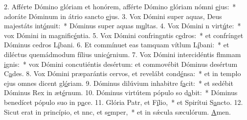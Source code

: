 2. Afférte Dómino glóriam et honórem, afférte Dómino glóriam nómni \uline{e}jus:~* adoráte Dóminum in átrio sancto \uline{e}jus.
3. Vox Dómini super aquas, Deus majestáts int\uline{ó}nuit:~* Dóminus super aquas m\uline{u}ltas.
4. Vox Dómini n virt\uline{ú}te:~* vox Dómini in magnific\uline{é}ntia.
5. Vox Dómini confringntis c\uline{e}dros:~* et confrínget Dóminus cedros L\uline{í}bani.
6. Et commínuet eas tamquam vítlum L\uline{í}bani:~* et diléctus quemádmodum fílius unic\uline{ó}rnium.
7. Vox Dómini intercidéntis flmmam \uline{i}gnis:~* vox Dómini concutiéntis desértum: et commovébit Dóminus desértum C\uline{a}des.
8. Vox Dómini præparántis cervos, et revelábt cond\uline{é}nsa:~* et in templo ejus omnes dicent gl\uline{ó}riam.
9. Dóminus dilúvium inhabitre f\uline{a}cit:~* et sedébit Dóminus Rex in æt\uline{é}rnum.
10. Dóminus virtútem pópulo so d\uline{a}bit:~* Dóminus benedícet pópulo suo in p\uline{a}ce.
11. Glória Patr, et F\uline{í}lio,~* et Spirítui S\uline{a}ncto.
12. Sicut erat in princípio, et nnc, et s\uline{e}mper,~* et in sǽcula sæculórum. \uline{A}men.
